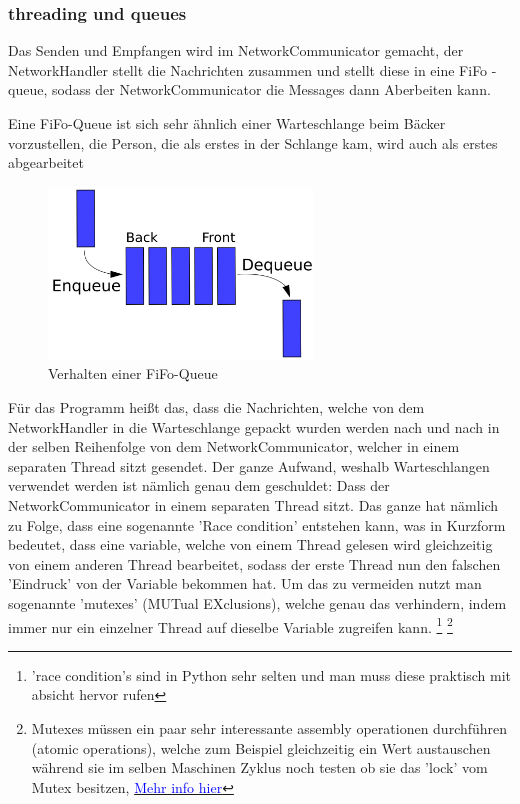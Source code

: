 \documentclass[a4paper]{article}
\begin{document}
                
            \pagebreak
            \subsubsection{threading und queues}
                Das Senden und Empfangen wird im NetworkCommunicator gemacht, der NetworkHandler stellt die Nachrichten zusammen und stellt diese in eine FiFo - queue, sodass der NetworkCommunicator die Messages dann Aberbeiten kann.
                
                Eine FiFo-Queue ist sich sehr ähnlich einer Warteschlange beim Bäcker vorzustellen, die Person, die als erstes in der Schlange kam, wird auch als erstes abgearbeitet
            
                \begin{figure}[t]
                    \includegraphics[width=7cm]{images/FiFoQueue.png}
                    \centering
                    \caption{Verhalten einer FiFo-Queue}
                \end{figure}
            
                Für das Programm heißt das, dass die Nachrichten, welche von dem NetworkHandler in die Warteschlange gepackt wurden werden nach und nach in der selben Reihenfolge von dem NetworkCommunicator, welcher in einem separaten Thread sitzt gesendet.
                Der ganze Aufwand, weshalb Warteschlangen verwendet werden ist nämlich genau dem geschuldet: Dass der NetworkCommunicator in einem separaten Thread sitzt. Das ganze hat nämlich zu Folge, dass eine sogenannte 'Race condition' entstehen kann, was in Kurzform bedeutet, dass eine variable, welche von einem Thread gelesen wird gleichzeitig von einem anderen Thread bearbeitet, sodass der erste Thread nun den falschen 'Eindruck' von der Variable bekommen hat.
                Um das zu vermeiden nutzt man sogenannte 'mutexes' (MUTual EXclusions), welche genau das verhindern, indem immer nur ein einzelner Thread auf dieselbe Variable zugreifen kann.
                \footnote{'race condition's sind in Python sehr selten und man muss diese praktisch mit absicht hervor rufen}
                \footnote{Mutexes müssen ein paar sehr interessante assembly operationen durchführen (atomic operations), welche zum Beispiel gleichzeitig ein Wert austauschen während sie im selben Maschinen Zyklus noch testen ob sie das 'lock' vom Mutex besitzen, \href{https://www.youtube.com/watch?v=1tZhmTnk-vc}{\textcolor{blue}{Mehr info hier}}}
                
\end{document}
